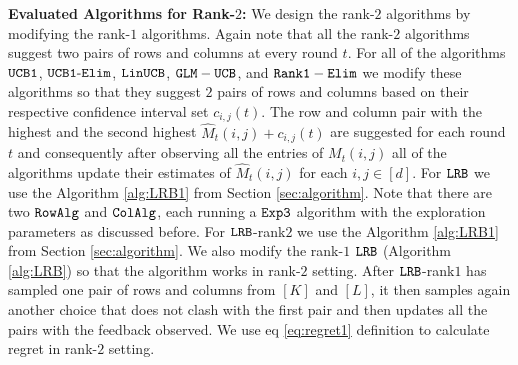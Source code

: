 \textbf{Evaluated Algorithms for Rank-$2$:} We design the rank-$2$ algorithms by modifying the rank-$1$ algorithms. Again note that all the rank-$2$ algorithms suggest two pairs of rows and columns at every round $t$. For all of the algorithms ${\tt UCB1}$, ${\tt UCB1\mbox{-}Elim}$, ${\tt LinUCB}$, $\tt GLM-UCB$, and $\tt Rank1-Elim$ we modify these algorithms so that they suggest $2$ pairs of rows and columns based on their respective confidence interval set $c_{i, j}(t)$. The row and column pair with the highest and the second highest $\hat{M}_{t}(i,j) + c_{i, j}(t)$ are suggested for each round $t$ and consequently after observing all the entries of $M_t(i,j)$ all of the algorithms update their estimates of $\hat{M}_{t}(i,j)$ for each $i,j \in [d]$. For ${\tt LRB}$ we use the Algorithm \ref{alg:LRB1} from Section \ref{sec:algorithm}. Note that there are two ${\tt RowAlg}$ and ${\tt ColAlg}$, each running a ${\tt Exp3}$ algorithm with the exploration parameters as discussed before. For ${\tt LRB}$-rank$2$ we use the Algorithm \ref{alg:LRB1} from Section \ref{sec:algorithm}. We also modify the rank-$1$ ${\tt LRB}$ (Algorithm \ref{alg:LRB}) so that the algorithm works in rank-$2$ setting. After ${\tt LRB}$-rank$1$ has sampled one pair of rows and columns from $[K]$ and $[L]$, it then samples again another choice that does not clash with the first pair and then updates all the pairs with the feedback observed. We use eq \eqref{eq:regret1} definition to calculate regret in rank-$2$ setting.





